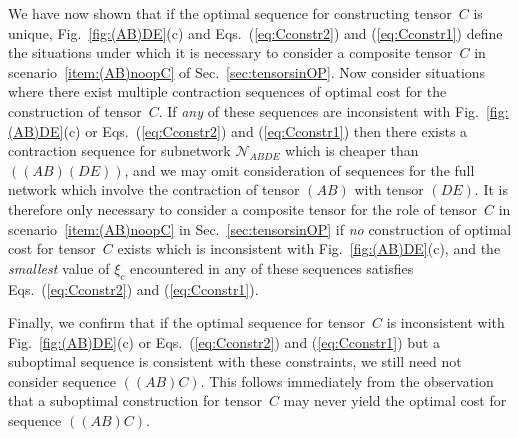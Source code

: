 \documentclass[aps,pre,reprint,superscriptaddress,amsfonts,amsmath,showpacs,nofootinbib,floatfix]{revtex4-1}
\newcommand{\mc}[1]{\mathcal{#1}}
\newcommand{\Erefs}[2]{Eqs.~(\ref{#1}) and (\ref{#2})}
\newcommand{\fref}[1]{Fig.~\ref{#1}}
\newcommand{\sref}[1]{Sec.~\ref{#1}}
\newcommand{\scref}[1]{scenario~\ref{#1}}
\newcommand{\xc}{\xi_c}
\begin{document}
We have now shown that if the optimal sequence for constructing tensor~$C$ is unique,
\fref{fig:(AB)DE}(c) and \Erefs{eq:Cconstr2}{eq:Cconstr1} define the situations under which it is necessary to consider a composite tensor~$C$ in \scref{item:(AB)noopC} of \sref{sec:tensorsinOP}. Now consider situations where there exist multiple contraction sequences of optimal cost for the construction of tensor~$C$. If \emph{any} of these sequences are inconsistent with \fref{fig:(AB)DE}(c) or \Erefs{eq:Cconstr2}{eq:Cconstr1} then there exists a contraction sequence for subnetwork $\mc{N}_{ABDE}$ which is cheaper than $((AB)(DE))$, and we may omit consideration of sequences for the full network which involve the contraction of tensor $(AB)$ with tensor $(DE)$. It is therefore only necessary to consider a composite tensor for the role of tensor~$C$ in \scref{item:(AB)noopC} in \sref{sec:tensorsinOP} if \emph{no} construction of optimal cost for tensor~$C$ exists which is inconsistent with \fref{fig:(AB)DE}(c), and the \emph{smallest} value of $\xc$ encountered in any of these sequences satisfies \Erefs{eq:Cconstr2}{eq:Cconstr1}.

Finally, we confirm that if the optimal sequence for tensor~$C$ is inconsistent with \fref{fig:(AB)DE}(c) or \Erefs{eq:Cconstr2}{eq:Cconstr1} but a suboptimal sequence is consistent with these constraints, we still need not consider sequence $((AB)C)$. This follows immediately from the observation that a suboptimal construction for tensor~$C$ may never yield the optimal cost for sequence $((AB)C)$.
\end{document}
